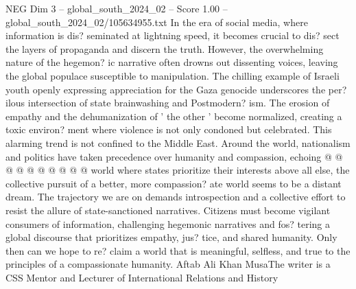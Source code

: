 \begin{textsample}{NEG Dim 3 – global\_south\_2024\_02 – Score 1.00 – global\_south\_2024\_02/105634955.txt}
In the era of social media, where information is dis? seminated at lightning speed, it becomes crucial to dis? sect the layers of propaganda and discern the truth.
However, the overwhelming nature of the hegemon? ic narrative often drowns out dissenting voices, leaving the global populace susceptible to manipulation.
The chilling example of Israeli youth openly expressing appreciation for the Gaza genocide underscores the per? ilous intersection of state brainwashing and Postmodern? ism.
The erosion of empathy and the dehumanization of ' the other ' become normalized, creating a toxic environ? ment where violence is not only condoned but celebrated.
This alarming trend is not confined to the Middle East.
Around the world, nationalism and politics have taken precedence over humanity and compassion, echoing @ @ @ @ @ @ @ @ @ @ world where states prioritize their interests above all else, the collective pursuit of a better, more compassion? ate world seems to be a distant dream.
The trajectory we are on demands introspection and a collective effort to resist the allure of state-sanctioned narratives.
Citizens must become vigilant consumers of information, challenging hegemonic narratives and fos? tering a global discourse that prioritizes empathy, jus? tice, and shared humanity.
Only then can we hope to re? claim a world that is meaningful, selfless, and true to the principles of a compassionate humanity.
Aftab Ali Khan MusaThe writer is a CSS Mentor and Lecturer of International Relations and History

\end{textsample}
